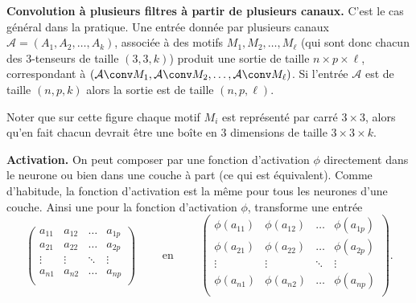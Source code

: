 \documentclass[11pt,class=report,crop=false]{standalone}
\begin{document}
   
   
\bigskip

\textbf{Convolution à plusieurs filtres à partir de plusieurs canaux.}   
C'est le cas général dans la pratique. 
Une entrée donnée par plusieurs canaux $\mathcal{A} = (A_1, A_2,\ldots, A_k)$,
associée à des motifs $M_1, M_2,\ldots,M_\ell$ (qui sont donc chacun des $3$-tenseurs de taille $(3,3,k)$) produit une sortie de taille $n \times p \times \ell$, correspondant à 
$(\mathcal{A} \conv M_1, \mathcal{A} \conv M_2, \ldots, \mathcal{A} \conv M_\ell)$.
Si l'entrée $\mathcal{A}$ est de taille $(n,p,k)$ alors la sortie est de taille $(n,p,\ell)$.

Noter que sur cette figure chaque motif $M_i$ est représenté par carré $3\times3$, alors qu'en fait chacun devrait être une boîte en $3$ dimensions de taille $3\times 3\times k$.

\bigskip

\textbf{Activation.} On peut composer par une fonction d'activation $\phi$ directement dans le neurone ou bien dans une couche à part (ce qui est équivalent).
Comme d'habitude, la fonction d'activation est la même pour tous les neurones d'une couche. Ainsi une  pour la fonction d'activation $\phi$, transforme une entrée 
$$\begin{pmatrix}
  a_{11} & a_{12} & \ldots & a_{1p}  \\
  a_{21}  & a_{22}   & \ldots    & a_{2p}\\
  \vdots & \vdots & \ddots & \vdots  \\
  a_{n1} & a_{n2} & \ldots & a_{np}  \\
\end{pmatrix}
\qquad \text{ en } \qquad
\begin{pmatrix}
  \phi(a_{11}) & \phi(a_{12}) & \ldots & \phi(a_{1p})  \\
  \phi(a_{21})  & \phi(a_{22})   & \ldots    & \phi(a_{2p})\\
  \vdots & \vdots & \ddots & \vdots  \\
  \phi(a_{n1}) & \phi(a_{n2}) & \ldots & \phi(a_{np})  \\
\end{pmatrix}.
$$

\end{document}
